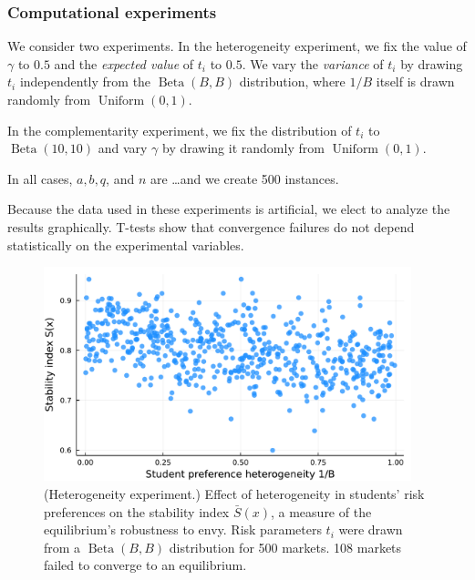 \documentclass[12pt]{article} %
\theoremstyle{definition}
\theoremstyle{definition}
\begin{document}
\subsubsection{Computational experiments}
We consider two experiments. In the heterogeneity experiment, we fix the value of $\gamma$ to $0.5$ and the \emph{expected value} of $t_i$ to $0.5$. We vary the \emph{variance} of $t_i$ by drawing $t_i$ independently from the $\operatorname{Beta}(B, B)$ distribution, where $1/B$ itself is drawn randomly from $\operatorname{Uniform}(0, 1)$.

In the complementarity experiment, we fix the distribution of $t_i$ to $\operatorname{Beta}(10, 10)$ and vary $\gamma$ by drawing it randomly from $\operatorname{Uniform}(0, 1)$.

In all cases, $a, b, q$, and $n$ are \dots and we create 500 instances. 

Because the data used in these experiments is artificial, we elect to analyze the results graphically. T-tests show that convergence failures do not depend statistically on the experimental variables.


\pagebreak
\begin{figure}[h!]
  \begin{center}\includegraphics[width=0.95\textwidth]{./TwoSchoolModels/CombiPref-complementarity/heterogeneity-S.pdf}\end{center}
  \caption{(Heterogeneity experiment.) Effect of heterogeneity in students' risk preferences on the stability index $\bar S(x)$, a measure of the equilibrium's robustness to envy. Risk parameters $t_i$ were drawn from a $\operatorname{Beta}(B, B)$ distribution for 500 markets. 108 markets failed to converge to an equilibrium.}
\end{figure}
\end{document}
